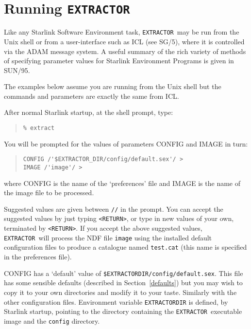 \documentclass[twoside,11pt]{article}
\newcommand{\htmlref}[2]{#1}
\newcommand{\latex}[1]{#1}
\newcommand{\xref}[3]{#1}
\newcommand{\xlabel}[1]{}
\renewcommand{\_}{\texttt{\symbol{95}}}
\newcommand{\EXTRACTOR}{\texttt{EXTRACTOR}}
\begin{document}
\section{\xlabel{running_extractor}\label{running_extractor}Running \EXTRACTOR}
Like any Starlink Software Environment task, \EXTRACTOR\ may be run from the
Unix shell or from a user-interface such as 
\xref{ICL}{sg5}{abstract}\latex{ (see SG/5)},
where it is controlled via the ADAM message system.
A useful summary of the rich variety of methods of specifying parameter values
for Starlink Environment Programs is given in
\xref{SUN/95}{sun95}{se_param}.

The examples below assume you are running from the Unix shell but the commands
and parameters are exactly the same from ICL.

After normal Starlink startup, at the shell prompt, type:

\begin{quote} \begin{verbatim}
% extract
\end{verbatim} \end{quote}

You will be prompted for the values of parameters CONFIG and IMAGE in turn:

\begin{quote} \begin{verbatim}
CONFIG /'$EXTRACTOR_DIR/config/default.sex'/ >
IMAGE /'image'/ >
\end{verbatim} \end{quote}

where CONFIG is the name of the `preferences' file and IMAGE is the name of 
the image file to be processed.

Suggested values are given between \texttt{//} in the prompt.
You can accept the suggested values by just typing \verb!<RETURN>!, or type in 
new values of your own, terminated by \verb!<RETURN>!.
If you accept the above suggested values, \EXTRACTOR\ will process the NDF
file \texttt{image} using the installed default configuration files to 
produce a catalogue named \texttt{test.cat} (this name is specified in the 
preferences file).

CONFIG has a `default' value of 
\texttt{\$EXTRACTOR\_DIR/config/default.sex}.
This file has some 
\htmlref{sensible defaults}{defaults}
\latex{(described in Section~\ref{defaults})} but you may wish to copy it to 
your own directories and modify it to your taste.
Similarly with the other configuration files. 
Environment variable \texttt{EXTRACTOR\_DIR} is defined, by Starlink startup,
pointing to the directory containing the \EXTRACTOR\ executable image and the
\texttt{config} directory.
\end{document}
